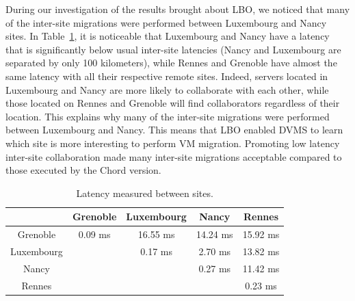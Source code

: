 During our investigation of the results brought about LBO, we noticed that many of the
inter-site migrations were performed between Luxembourg and Nancy sites.
In Table~\ref{latency_table}, it is noticeable that Luxembourg and Nancy have a latency that is significantly
below usual inter-site latencies (Nancy and Luxembourg are separated by only 100 kilometers),
while Rennes and Grenoble have almost the same latency with all their respective remote sites.
Indeed, servers located in Luxembourg and Nancy are more likely to collaborate with each other, while those located
on Rennes and Grenoble will find collaborators regardless of their location. This explains
why many of the inter-site migrations were performed between Luxembourg and Nancy.
This means that LBO enabled DVMS to learn which site is more interesting to perform VM
migration. Promoting low latency inter-site collaboration made many inter-site
migrations acceptable compared to those executed by the Chord version.


\begin{table}[t!]

  \begin{center}
    \begin{tabular}{|c|c|c|c|c|}   

      \hline \multicolumn{1}{|p{2cm}|}{ } & \multicolumn{1}{|p{2cm}|}{\centering Grenoble }  & \multicolumn{1}{|p{2cm}|}{\centering Luxembourg } & \multicolumn{1}{|p{2cm}|}{\centering Nancy }& \multicolumn{1}{|p{2cm}|}{\centering Rennes } \\

      \hline
      Grenoble & 0.09 ms & 16.55 ms & 14.24 ms & 15.92 ms \\

      \hline
      Luxembourg &  & 0.17 ms & 2.70 ms & 13.82 ms \\

      \hline
      Nancy & &  & 0.27 ms & 11.42 ms \\

      \hline
      Rennes &  &  &  & 0.23 ms \\

      \hline
    \end{tabular}
  \end{center}
  \caption{\label{latency_table} Latency measured between sites.}
\end{table}


